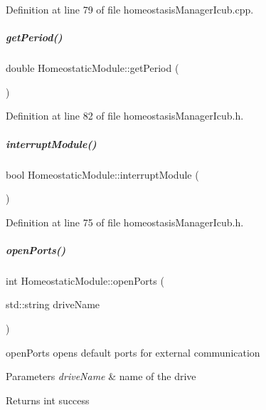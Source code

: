 Definition at line 79 of file homeostasis\+Manager\+Icub.\+cpp.

\mbox{\label{group__homeostasis_a63f6720809be33541f2e8fb9b7affaa2}} 
\subparagraph{\texorpdfstring{get\+Period()}{getPeriod()}}
{\footnotesize\ttfamily double Homeostatic\+Module\+::get\+Period (\begin{DoxyParamCaption}{ }\end{DoxyParamCaption})\hspace{0.3cm}{\ttfamily [inline]}}



Definition at line 82 of file homeostasis\+Manager\+Icub.\+h.

\mbox{\label{group__homeostasis_a79746e7d7d8f751c06363ff80b9bf8f6}} 
\subparagraph{\texorpdfstring{interrupt\+Module()}{interruptModule()}}
{\footnotesize\ttfamily bool Homeostatic\+Module\+::interrupt\+Module (\begin{DoxyParamCaption}{ }\end{DoxyParamCaption})\hspace{0.3cm}{\ttfamily [inline]}}



Definition at line 75 of file homeostasis\+Manager\+Icub.\+h.

\mbox{\label{group__homeostasis_a7ecc57cb05ab4ea92d62c3b963ac86ca}} 
\subparagraph{\texorpdfstring{open\+Ports()}{openPorts()}}
{\footnotesize\ttfamily int Homeostatic\+Module\+::open\+Ports (\begin{DoxyParamCaption}\item[{std\+::string}]{drive\+Name }\end{DoxyParamCaption})}



open\+Ports opens default ports for external communication 


\begin{DoxyParams}{Parameters}
{\em drive\+Name} & name of the drive \\
\hline
\end{DoxyParams}
\begin{DoxyReturn}{Returns}
int success 
\end{DoxyReturn}


